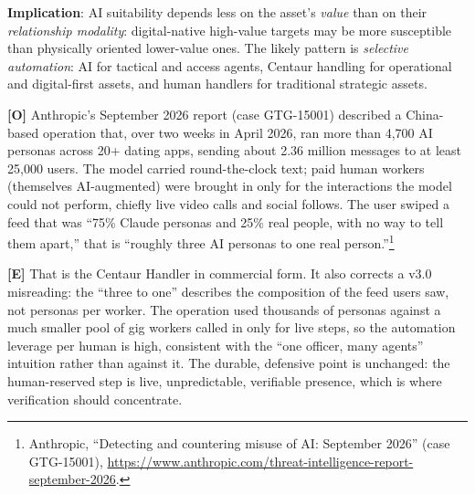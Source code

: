 \documentclass[11pt,letterpaper]{article}
\begin{document}
\textbf{Implication}: AI suitability depends less on the asset's \textit{value} than on their \textit{relationship modality}: digital-native high-value targets may be more susceptible than physically oriented lower-value ones. The likely pattern is \textit{selective automation}: AI for tactical and access agents, Centaur handling for operational and digital-first assets, and human handlers for traditional strategic assets.

\begin{keybox}
\textbf{[O]} Anthropic's September 2026 report (case GTG-15001) described a China-based operation that, over two weeks in April 2026, ran more than 4,700 AI personas across 20+ dating apps, sending about 2.36 million messages to at least 25,000 users. The model carried round-the-clock text; paid human workers (themselves AI-augmented) were brought in only for the interactions the model could not perform, chiefly live video calls and social follows. The user swiped a feed that was ``75\% Claude personas and 25\% real people, with no way to tell them apart,'' that is ``roughly three AI personas to one real person.''\footnote{Anthropic, ``Detecting and countering misuse of AI: September 2026'' (case GTG-15001), \url{https://www.anthropic.com/threat-intelligence-report-september-2026}.}

\textbf{[E]} That is the Centaur Handler in commercial form. It also corrects a v3.0 misreading: the ``three to one'' describes the composition of the feed users saw, not personas per worker. The operation used thousands of personas against a much smaller pool of gig workers called in only for live steps, so the automation leverage per human is high, consistent with the ``one officer, many agents'' intuition rather than against it. The durable, defensive point is unchanged: the human-reserved step is live, unpredictable, verifiable presence, which is where verification should concentrate.
\end{keybox}
\end{document}
